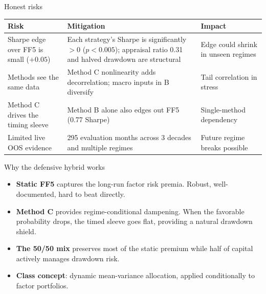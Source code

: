 \documentclass[aspectratio=169, 12pt]{beamer}
\newcommand{\emphp}[1]{{\color{inertiapurple}\textbf{#1}}}
\newcommand{\emphb}[1]{{\color{inertiablue}\textbf{#1}}}
\begin{document}
\begin{frame}{Honest risks}
  \vspace{6pt}
  \begin{center}
  \footnotesize
  \begin{tabular}{p{} p{} p{}}
    \toprule
    \textbf{Risk} & \textbf{Mitigation} & \textbf{Impact} \\
    \midrule
    Sharpe edge over FF5 is small ($+0.05$) & Each strategy's Sharpe is significantly $> 0$ ($p < 0.005$); appraisal ratio 0.31 and halved drawdown are structural & Edge could shrink in unseen regimes \\[3pt]
    Methods see the same data & Method C nonlinearity adds decorrelation; macro inputs in B diversify & Tail correlation in stress \\[3pt]
    Method C drives the timing sleeve & Method B alone also edges out FF5 (0.77 Sharpe) & Single-method dependency \\[3pt]
    Limited live OOS evidence & 295 evaluation months across 3 decades and multiple regimes & Future regime breaks possible \\
    \bottomrule
  \end{tabular}
  \end{center}
\end{frame}

\begin{frame}{Why the defensive hybrid works}
  \vspace{16pt}
  \begin{itemize}\setlength{\itemsep}{6pt}
    \item \emphp{Static FF5} captures the long-run factor risk premia. Robust, well-documented, hard to beat directly.
    \item \emphp{Method C} provides regime-conditional dampening. When the favorable probability drops, the timed sleeve goes flat, providing a natural drawdown shield.
    \item \emphp{The 50/50 mix} preserves most of the static premium while half of capital actively manages drawdown risk.
    \item \emphb{Class concept}: dynamic mean-variance allocation, applied conditionally to factor portfolios.
  \end{itemize}
  \vspace{14pt}
\end{frame}
\end{document}
